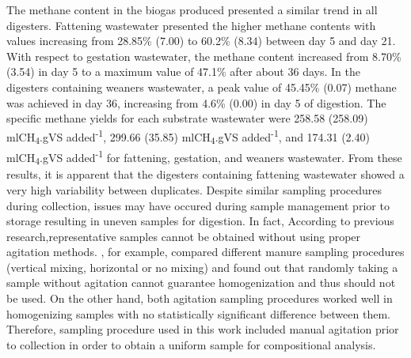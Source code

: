 The methane content in the biogas produced presented a similar trend in all digesters. Fattening wastewater presented the higher methane contents with values increasing from 28.85\% (7.00) to 60.2\% (8.34) between day 5 and day 21. With respect to gestation wastewater, the methane content increased from 8.70\% (3.54) in day 5 to a maximum value of 47.1\% after about 36 days. In the digesters containing weaners wastewater, a peak value of 45.45\% (0.07) methane was achieved in day 36, increasing from 4.6\% (0.00) in day 5 of digestion. The specific methane yields for each substrate wastewater were 258.58 (258.09) mlCH\textsubscript{4}.gVS added\textsuperscript{-1}, 299.66 (35.85) mlCH\textsubscript{4}.gVS added\textsuperscript{-1}, and 174.31 (2.40) mlCH\textsubscript{4}.gVS added\textsuperscript{-1} for fattening, gestation, and weaners wastewater. From these results, it is apparent that the digesters containing fattening wastewater showed a very high variability between duplicates. Despite similar sampling procedures during collection, issues may have occured during sample management prior to storage resulting in uneven samples for digestion. In fact,  According to previous research,representative samples cannot be obtained without using proper agitation methods. \cite{Zhu_2004}, for example, compared different manure sampling procedures (vertical mixing, horizontal or no mixing) and found out that randomly taking a sample without agitation cannot guarantee homogenization and thus should not be used. On the other hand, both agitation sampling procedures worked well in homogenizing samples with no statistically significant difference between them.  Therefore, sampling procedure used in this work included manual agitation prior to collection in order to obtain a uniform sample for compositional analysis. 